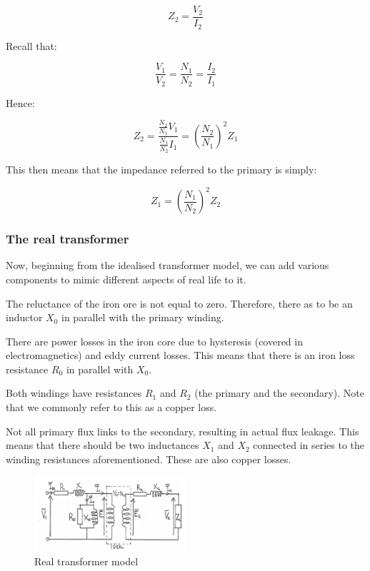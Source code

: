 \documentclass{article}
\begin{document}
\[ Z_2 = \frac{V_2}{I_2} \]

Recall that:

\[ \frac{V_1}{V_2} = \frac{N_1}{N_2} = \frac{I_2}{I_1} \]

Hence:

\[ Z_2 = \frac{\frac{N_2}{N_1}V_1}{\frac{N_1}{N_2}I_1} = \left(\frac{N_2}{N_1}\right)^2Z_1 \]

This then means that the impedance referred to the primary is simply:

\[ Z_1 = \left(\frac{N_1}{N_2}\right)^2Z_2 \]

\subsubsection{The real transformer}

Now, beginning from the idealised transformer model, we can add various components to mimic different aspects of real life to it.

\begin{proposition}
    The reluctance of the iron ore is not equal to zero. Therefore, there as to be an inductor $X_0$ in parallel with the primary winding.
\end{proposition}

\begin{proposition}
    There are power losses in the iron core due to hysteresis (covered in electromagnetics) and eddy current losses. This means that there is an iron loss resistance $R_0$ in parallel with $X_0$.
\end{proposition}

\begin{proposition}
    Both windings have resistances $R_1$ and $R_2$ (the primary and the secondary). Note that we commonly refer to this as a copper loss.
\end{proposition}

\begin{proposition}
    Not all primary flux links to the secondary, resulting in actual flux leakage. This means that there should be two inductances $X_1$ and $X_2$ connected in series to the winding resistances aforementioned. These are also copper losses.
\end{proposition}

\begin{figure}[h]
    \centering
    \includegraphics[width = 0.5\textwidth]{images/Screenshot 2024-04-05 160059.png}
    \caption{Real transformer model}
    \label{fig:enter-label}
\end{figure}
\end{document}
